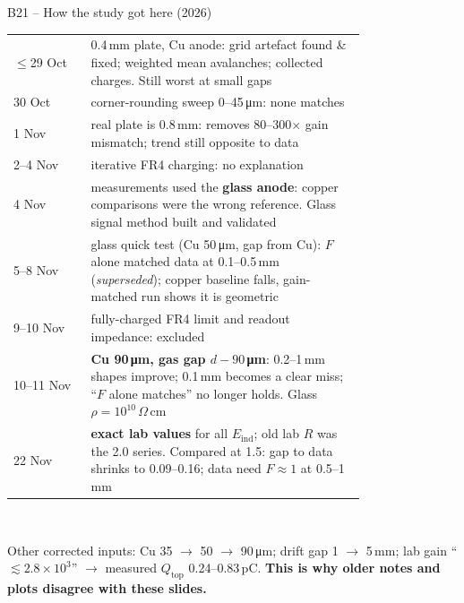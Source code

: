 \documentclass[aspectratio=169,11pt]{beamer}
\newcommand{\backlink}[1]{\hfill\hyperlink{#1}{\beamerreturnbutton{back}}}
\newcommand{\Qtop}{Q_\text{top}}
\newcommand{\Eind}{E_\text{ind}}
\begin{document}
\begin{frame}[label=b-history]{B21 -- How the study got here (2026)}
  \centering\footnotesize
  \begin{tabular}{lp{0.78\linewidth}}\toprule
    $\le$29 Oct & 0.4\,mm plate, Cu anode: grid artefact found \& fixed; weighted mean avalanches; collected charges. Still worst at small gaps\\
    30 Oct & corner-rounding sweep 0--45\,\si{\micro m}: none matches\\
    1 Nov & real plate is 0.8\,mm: removes 80--300$\times$ gain mismatch; trend still opposite to data\\
    2--4 Nov & iterative FR4 charging: no explanation\\
    4 Nov & measurements used the \textbf{glass anode}: copper comparisons were the wrong reference. Glass signal method built and validated\\
    5--8 Nov & glass quick test (Cu 50\,\si{\micro m}, gap from Cu): $F$ alone matched data at 0.1--0.5\,mm (\emph{superseded}); copper baseline falls, gain-matched run shows it is geometric\\
    9--10 Nov & fully-charged FR4 limit and readout impedance: excluded\\
    10--11 Nov & \textbf{Cu 90\,\si{\micro m}, gas gap $d-90$\,\si{\micro m}}: 0.2--1\,mm shapes improve; 0.1\,mm becomes a clear miss; ``$F$ alone matches'' no longer holds. Glass $\rho=10^{10}\,\Omega\,$cm\\
    22 Nov & \textbf{exact lab values} for all $\Eind$; old lab $R$ was the 2.0 series. Compared at 1.5: gap to data shrinks to 0.09--0.16; data need $F\approx1$ at 0.5--1\,mm\\\bottomrule
  \end{tabular}\\[4pt]
  \raggedright\small Other corrected inputs: Cu 35 $\to$ 50 $\to$ 90\,\si{\micro m}; drift gap 1 $\to$ 5\,mm; lab gain ``$\lesssim2.8\times10^3$'' $\to$ measured $\Qtop$ 0.24--0.83\,pC.
  \textbf{This is why older notes and plots disagree with these slides.}
  \backlink{m-det}
\end{frame}
\end{document}
